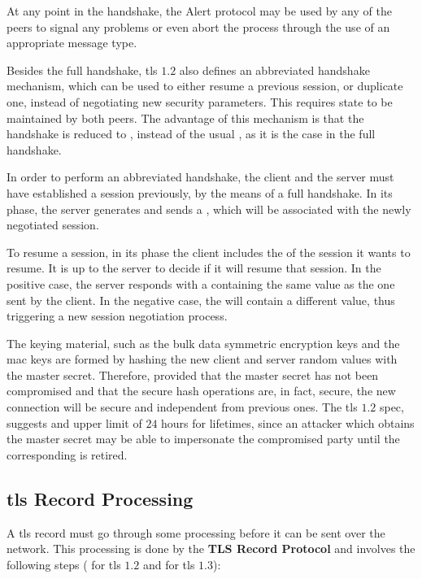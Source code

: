\documentclass{llncs}
\begin{document}
At any point in the handshake, the Alert protocol may be used by any of the peers
to signal any problems or even abort the process through the use of an appropriate message type.

Besides the full handshake, \gls{tls} $1.2$ also defines an
abbreviated handshake mechanism, which can be used to either resume a previous session,
or duplicate one, instead of negotiating new security parameters. This
requires state to be maintained by both peers. The advantage of this mechanism is that the handshake is reduced
to , instead of the usual , as it is the case in the full handshake.

In order to perform an abbreviated handshake,
the client and the server must have established a session previously, by the
means of a full handshake. In its  phase, the server generates and sends a , which will be associated with the newly negotiated session.

To resume a session, in its  phase the client includes the  of the session it wants to
resume. It is up to the server to decide if it
will resume that session. In the positive case, the server responds with a  containing
the same  value as the one sent by the client. In the negative
case, the  will contain a different  value, thus
triggering a new session negotiation process.

The keying material, such as the bulk
data symmetric encryption keys and the \gls{mac} keys are formed by hashing the new client
and server random values with the master secret. Therefore, provided that the master secret has not been compromised and that the secure
hash operations are, in fact, secure, the new connection will be secure and independent
from previous ones. The \gls{tls} $1.2$ spec, suggests and upper limit
of $24$ hours for  lifetimes, since an attacker which obtains the master secret
may be able to impersonate the compromised party until the corresponding  is retired.

\subsection{\gls{tls} Record Processing} \label{record}

A \gls{tls} record must go through some processing before it can be sent over the network.
This processing is done by the \textbf {TLS Record Protocol} and involves the following steps ( for \gls{tls} $1.2$ and  for \gls{tls} $1.3$):
\end{document}
